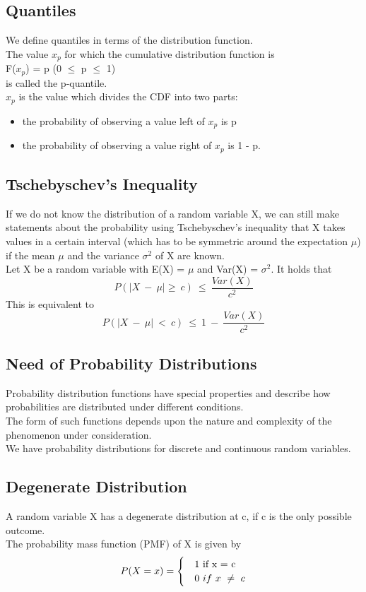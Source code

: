 \subsection*{Quantiles}
We define quantiles in terms of the distribution function.\\
The value $x_p$ for which the cumulative distribution function is\\
F($x_p$) = p (0 $\leq$ p $\leq$ 1)\\
is called the p‐quantile.\\
$x_p$ is the value which divides the CDF into two parts:
\begin{itemize}
    \item the probability of observing a value left of $x_p$ is p
    \item the probability of observing a value right of $x_p$ is 1 - p.
\end{itemize}

\subsection*{Tschebyschev's Inequality}
If we do not know the distribution of a random variable X, we can still
make statements about the probability using Tschebyschev’s
inequality that X takes values in a certain interval (which has to be
symmetric around the expectation $\mu$) if the mean $\mu$ and the variance
$\sigma^2$ of X are known.\\
Let X be a random variable with E(X) = $\mu$ and Var(X) = $\sigma^2$. It holds that \[ P(|X\ -\ \mu| \geq \ c)\ \leq \ \frac{Var(X)}{c^2} \]
This is equivalent to \[ P(|X\ -\ \mu|\ <\ c)\ \leq \ 1\ -\ \frac{Var(X)}{c^2} \]

\subsection*{Need of Probability Distributions}
Probability distribution functions have
special properties and describe how probabilities are distributed
under different conditions.\\
The form of such functions depends upon the nature and complexity
of the phenomenon under consideration.\\
We have probability distributions for discrete and continuous
random variables.

\subsection*{Degenerate Distribution}
A random variable X has a degenerate distribution at c, if c is the only
possible outcome.\\
The probability mass function (PMF) of X is given by
\begin{equation}
P(X = x) =
\begin{cases}
& $1\ if\ x\ =\ c$\\
& 0\ if\ x\ \neq \ c
\end{cases}
\end{equation}

